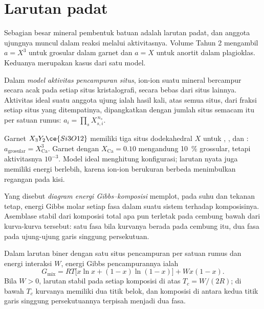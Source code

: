 \section{Larutan padat}\label{sec:b3:petrological-thermodynamics:solutions}

Sebagian besar mineral pembentuk batuan adalah larutan padat, dan anggota ujungnya
muncul dalam reaksi melalui aktivitasnya. Volume Tahun 2 mengambil $a = X^3$ untuk
grosular dalam garnet dan $a = X$ untuk anortit dalam plagioklas.
Keduanya merupakan kasus dari satu model.

\begin{definition}\label{def:b3:petrological-thermodynamics:site-mixing}
Dalam \emph{model aktivitas pencampuran situs}, ion-ion
suatu mineral bercampur secara acak pada setiap situs kristalografi, secara bebas dari
situs lainnya. Aktivitas ideal suatu anggota ujung ialah hasil kali,
atas semua situs, dari fraksi setiap situs yang ditempatinya, dipangkatkan dengan jumlah
situs semacam itu per satuan rumus: $a_i = \prod_s X_{s,i}^{\,n_s}$.
\end{definition}

Garnet $X_3Y_2\ce{Si3O12}$ memiliki tiga situs dodekahedral $X$ untuk
, ,  dan : $a_{\text{grosular}} =
X_{\text{Ca}}^3$. Garnet dengan $X_{\text{Ca}} = 0.10$ mengandung
\qty{10}{\percent} grossular, tetapi aktivitasnya $10^{-3}$. Model ideal
menghitung konfigurasi; larutan nyata juga memiliki energi berlebih,
karena ion-ion berukuran berbeda menimbulkan regangan pada kisi.

\begin{definition}\label{def:b3:petrological-thermodynamics:gx}
Yang disebut \emph{diagram energi Gibbs--komposisi}
memplot, pada suhu dan tekanan tetap, energi Gibbs molar setiap
fasa dalam suatu sistem terhadap komposisinya. Asemblase stabil dari komposisi total apa pun
terletak pada cembung bawah dari kurva-kurva tersebut: satu fasa
bila kurvanya berada pada cembung itu, dua fasa pada ujung-ujung garis singgung persekutuan.
\end{definition}

\begin{proposition}\label{prop:b3:petrological-thermodynamics:regular}
Dalam larutan biner dengan satu situs pencampuran per satuan rumus dan
energi interaksi $W$, energi Gibbs pencampurannya ialah
\[
  G_{\text{mix}} = RT\bigl[x\ln x + (1 - x)\ln(1 - x)\bigr] + Wx(1 - x).
\]
Bila $W > 0$, larutan stabil pada setiap komposisi di atas $T_c =
W/(2R)$; di bawah $T_c$ kurvanya memiliki dua titik belok, dan komposisi
di antara kedua titik garis singgung persekutuannya terpisah menjadi dua fasa.
\end{proposition}

